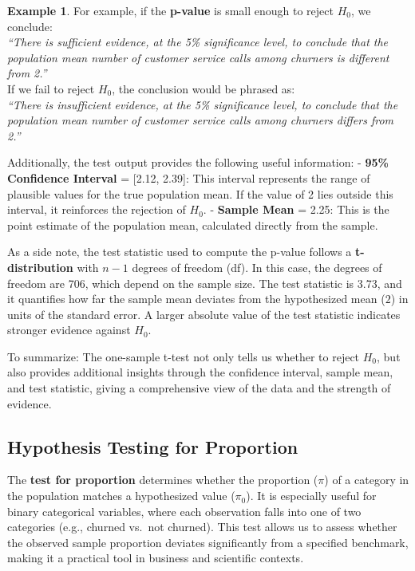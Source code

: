 \documentclass[
]{book}
\theoremstyle{definition}
\theoremstyle{definition}
\newtheorem{example}{Example}[chapter]
\theoremstyle{definition}
\theoremstyle{definition}
\theoremstyle{remark}
\begin{document}
\begin{example}
For example, if the \textbf{p-value} is small enough to reject \(H_0\), we conclude:\\
\emph{``There is sufficient evidence, at the 5\% significance level, to conclude that the population mean number of customer service calls among churners is different from 2.''}\\
If we fail to reject \(H_0\), the conclusion would be phrased as:\\
\emph{``There is insufficient evidence, at the 5\% significance level, to conclude that the population mean number of customer service calls among churners differs from 2.''}

Additionally, the test output provides the following useful information:
- \textbf{95\% Confidence Interval} = {[}2.12, 2.39{]}: This interval represents the range of plausible values for the true population mean. If the value of 2 lies outside this interval, it reinforces the rejection of \(H_0\).
- \textbf{Sample Mean} = 2.25: This is the point estimate of the population mean, calculated directly from the sample.

As a side note, the test statistic used to compute the p-value follows a \textbf{t-distribution} with \(n - 1\) degrees of freedom (df). In this case, the degrees of freedom are 706, which depend on the sample size. The test statistic is 3.73, and it quantifies how far the sample mean deviates from the hypothesized mean (\(2\)) in units of the standard error. A larger absolute value of the test statistic indicates stronger evidence against \(H_0\).

To summarize: The one-sample t-test not only tells us whether to reject \(H_0\), but also provides additional insights through the confidence interval, sample mean, and test statistic, giving a comprehensive view of the data and the strength of evidence.
\end{example}

\subsection{Hypothesis Testing for Proportion}\label{hypothesis-testing-for-proportion}

The \textbf{test for proportion} determines whether the proportion (\(\pi\)) of a category in the population matches a hypothesized value (\(\pi_0\)). It is especially useful for binary categorical variables, where each observation falls into one of two categories (e.g., churned vs.~not churned). This test allows us to assess whether the observed sample proportion deviates significantly from a specified benchmark, making it a practical tool in business and scientific contexts.
\end{document}
